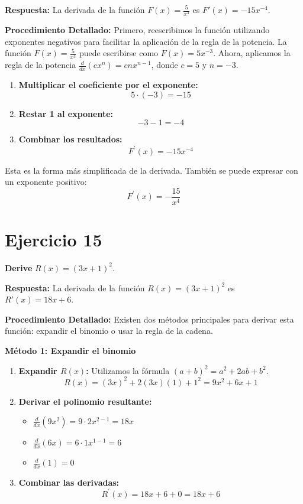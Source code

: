 \documentclass[12pt, a4paper]{article}
\begin{document}
\textbf{Respuesta:}
La derivada de la función $F(x)=\frac{5}{x^3}$ es $F'(x)=-15x^{-4}$.

\textbf{Procedimiento Detallado:}
Primero, reescribimos la función utilizando exponentes negativos para facilitar la aplicación de la regla de la potencia. La función $F(x)=\frac{5}{x^3}$ puede escribirse como $F(x)=5x^{-3}$.
Ahora, aplicamos la regla de la potencia $\frac{d}{dx}(cx^n)=cnx^{n-1}$, donde $c=5$ y $n=-3$.
\begin{enumerate}
    \item \textbf{Multiplicar el coeficiente por el exponente:}
    \[5\cdot(-3)=-15\]
    \item \textbf{Restar 1 al exponente:}
    \[-3-1=-4\]
    \item \textbf{Combinar los resultados:}
    \[F^{\prime}(x)=-15x^{-4}\]
\end{enumerate}
Esta es la forma más simplificada de la derivada. También se puede expresar con un exponente positivo:
\[F^{\prime}(x)=-\frac{15}{x^4}\]

\section{Ejercicio 15}
\textbf{Derive} $R(x)=(3x+1)^2$.

\textbf{Respuesta:}
La derivada de la función $R(x)=(3x+1)^2$ es $R'(x)=18x+6$.

\textbf{Procedimiento Detallado:}
Existen dos métodos principales para derivar esta función: expandir el binomio o usar la regla de la cadena.

\textbf{Método 1: Expandir el binomio}
\begin{enumerate}
    \item \textbf{Expandir $R(x)$:} Utilizamos la fórmula $(a+b)^2=a^2+2ab+b^2$.
    \[R(x)=(3x)^2+2(3x)(1)+1^2=9x^2+6x+1\]
    \item \textbf{Derivar el polinomio resultante:}
    \begin{itemize}
        \item $\frac{d}{dx}(9x^2)=9 \cdot 2x^{2-1}=18x$
        \item $\frac{d}{dx}(6x)=6 \cdot 1x^{1-1}=6$
        \item $\frac{d}{dx}(1)=0$
    \end{itemize}
    \item \textbf{Combinar las derivadas:}
    \[R^{\prime}(x)=18x+6+0=18x+6\]
\end{enumerate}
\end{document}
